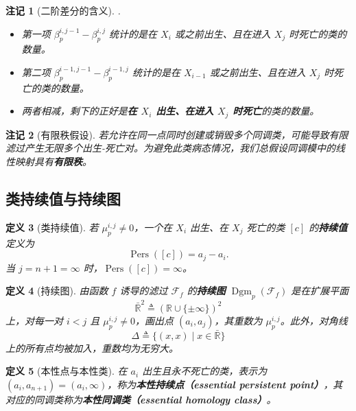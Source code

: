 \documentclass[UTF8]{ctexart}
\newtheorem{definition}{定义}[section]
\newtheorem{remark}[definition]{注记}
\begin{document}
\begin{remark}[二阶差分的含义].\\
\begin{itemize}
    \item 第一项 \(\beta_p^{i,j-1} - \beta_p^{i,j}\) 统计的是在 \(X_i\) 或之前出生、且在进入 \(X_j\) 时死亡的类的数量。
    \item 第二项 \(\beta_p^{i-1,j-1} - \beta_p^{i-1,j}\) 统计的是在 \(X_{i-1}\) 或之前出生、且在进入 \(X_j\) 时死亡的类的数量。
    \item 两者相减，剩下的正好是\textbf{在 \(X_i\) 出生、在进入 \(X_j\) 时死亡}的类的数量。
\end{itemize}
\end{remark}

\begin{remark}[有限秩假设]
若允许在同一点同时创建或销毁多个同调类，可能导致有限滤过产生无限多个出生-死亡对。为避免此类病态情况，我们总假设同调模中的线性映射具有\textbf{有限秩}。
\end{remark}

\subsection{类持续值与持续图}
\label{subsec:persistence-diagram-def}

\begin{definition}[类持续值]
\label{def:class-persistence}
若 \(\mu_p^{i,j} \neq 0\)，一个在 \(X_i\) 出生、在 \(X_j\) 死亡的类 \([c]\) 的\textbf{持续值}定义为
\[
\operatorname{Pers}([c]) = a_j - a_i.
\]
当 \(j = n+1 = \infty\) 时，\(\operatorname{Pers}([c]) = \infty\)。
\end{definition}

\begin{definition}[持续图]
\label{def:persistence-diagram}
由函数 \(f\) 诱导的滤过 \(\mathcal{F}_f\) 的\textbf{持续图} \(\operatorname{Dgm}_p(\mathcal{F}_f)\) 是在扩展平面
\[
\bar{\mathbb{R}}^2 \triangleq (\mathbb{R} \cup \{\pm\infty\})^2
\]
上，对每一对 \(i < j\) 且 \(\mu_p^{i,j} \neq 0\)，画出点 \((a_i, a_j)\)，其重数为 \(\mu_p^{i,j}\)。此外，对角线
\[
\Delta \triangleq \{(x, x) \mid x \in \bar{\mathbb{R}}\}
\]
上的所有点均被加入，重数均为无穷大。
\end{definition}

\begin{definition}[本性点与本性类]
\label{def:essential}
在 \(a_i\) 出生且永不死亡的类，表示为 \((a_i, a_{n+1}) = (a_i, \infty)\)，称为\textbf{本性持续点（essential persistent point）}，其对应的同调类称为\textbf{本性同调类（essential homology class）}。
\end{definition}
\end{document}
